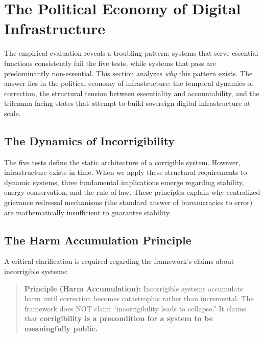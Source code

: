 \documentclass{article}
\begin{document}

\section{The Political Economy of Digital Infrastructure}
\label{sec:political-economy}

The empirical evaluation reveals a troubling pattern: systems that serve essential functions consistently fail the five tests, while systems that pass are predominantly non-essential. This section analyzes \textit{why} this pattern exists. The answer lies in the political economy of infrastructure: the temporal dynamics of correction, the structural tension between essentiality and accountability, and the trilemma facing states that attempt to build sovereign digital infrastructure at scale.

\subsection{The Dynamics of Incorrigibility}
\label{sec:dynamics}

The five tests define the static architecture of a corrigible system. However, infrastructure exists in time. When we apply these structural requirements to dynamic systems, three fundamental implications emerge regarding stability, energy conservation, and the rule of law. These principles explain why centralized grievance redressal mechanisms (the standard answer of bureaucracies to error) are mathematically insufficient to guarantee stability.

\subsection{The Harm Accumulation Principle}

A critical clarification is required regarding the framework's claims about incorrigible systems:

\begin{quote}
\textbf{Principle (Harm Accumulation):} Incorrigible systems accumulate harm until correction becomes catastrophic rather than incremental. The framework does NOT claim ``incorrigibility leads to collapse.'' It claims that \textbf{corrigibility is a precondition for a system to be meaningfully public.}
\end{quote}
\end{document}
